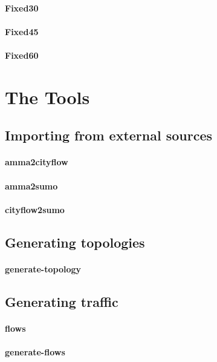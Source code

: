 \paragraph{Fixed30}
\paragraph{Fixed45}
\paragraph{Fixed60}

\section{The Tools}

\subsection{Importing from external sources}

\paragraph{amma2cityflow}
\paragraph{amma2sumo}
\paragraph{cityflow2sumo}

\subsection{Generating topologies}

\paragraph{generate-topology}

\subsection{Generating traffic}

\paragraph{flows}
\paragraph{generate-flows}
